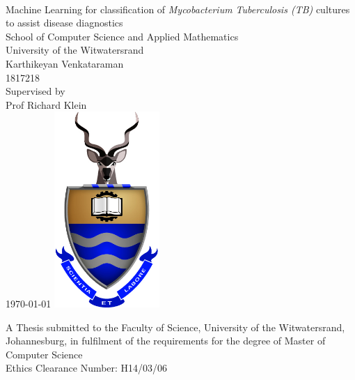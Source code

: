 \documentclass[a4paper,twoside,12pt]{report}
\begin{document}
\onecolumn
\thispagestyle{empty}


\setcounter{page}{0}
\ 
\begin{center}
  
  {
  \large Machine Learning for classification of  {\itshape Mycobacterium Tuberculosis (TB) } cultures to assist disease diagnostics\\[20pt]
  \large School of Computer Science and Applied Mathematics\\
  \large University of the Witwatersrand\\[20pt]
  \normalsize
  Karthikeyan Venkataraman\\
  1817218\\[20pt]
  Supervised by\\Prof Richard Klein\\[10pt]
  \today
  }
  \vfill
  \includegraphics[width=4cm]{images/wits}
  \vfill

  \vfill
  A Thesis submitted to the Faculty of Science, University of the Witwatersrand, Johannesburg, in fulfilment of the requirements for the degree of Master of Computer Science\\[10pt]
  \small{Ethics Clearance Number: H14/03/06}\\
\end{center}
\vfill
\newpage

\pagestyle{plain}
\setcounter{page}{1}
\end{document}
